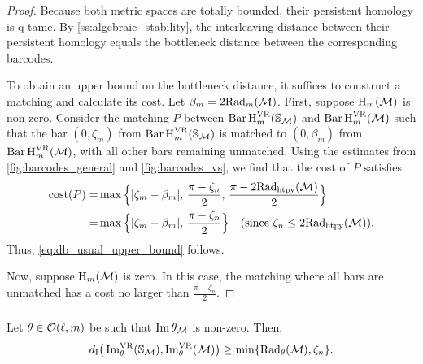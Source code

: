 \begin{proof}
    Because both metric spaces are totally bounded, their persistent homology is q-tame.
    By \cref{ss:algebraic_stability}, the interleaving distance between their persistent homology equals the bottleneck distance between the corresponding barcodes.

    To obtain an upper bound on the bottleneck distance, it suffices to construct a matching and calculate its cost.
    Let \(\beta_m = 2\firstdeath{m}{\cM}\).
    First, suppose \( \opH_m(\cM) \) is non-zero.
    Consider the matching \( P \) between \( \Hbarc[\field]{m}{\bS_{\cM}} \) and \( \Hbarc[\field]{m}{\cM} \) such that the bar \( (0, \zeta_m) \) from \( \Hbarc[\field]{m}{\bS_{\cM}} \) is matched to \( (0, \beta_m) \) from \( \Hbarc[\field]{m}{\cM} \), with all other bars remaining unmatched. Using the estimates from \cref{fig:barcodes_general} and \cref{fig:barcodes_vs}, we find that the cost of \( P \) satisfies
    \begin{align*}
        \cost(P)
        = & \max\Big\{|\zeta_m - \beta_m|,\, \frac{\pi - \zeta_n}{2},\, \frac{\pi - 2\crit(\cM)}{2}\Big\} \\
        = & \max\Big\{|\zeta_m - \beta_m|,\, \frac{\pi - \zeta_n}{2}\Big\} \quad \text{(since \( \zeta_n \leq 2\crit(\cM) \))}.
    \end{align*}
    Thus, \cref{eq:db_usual_upper_bound} follows.

    Now, suppose \( \opH_m(\cM) \) is zero. In this case, the matching where all bars are unmatched has a cost no larger than \( \frac{\pi - \zeta_n}{2}\).
\end{proof}

\subsubsection{}\label{sss:db_theta_lower_bound}

\lemma
Let $\theta \in \cO(\ell, m)$ be such that $\img \theta_\cM$ is non-zero.
Then,
\begin{equation}\label{eq:db_theta_lower_bound}
	\di\big(\img^{\VR}_{\theta}(\bS_{\cM}), \img^{\VR}_{\theta}(\cM)\big)
	\geq \min\{\firstdeath{\theta}{\cM}, \zeta_n\}. %
\end{equation}

